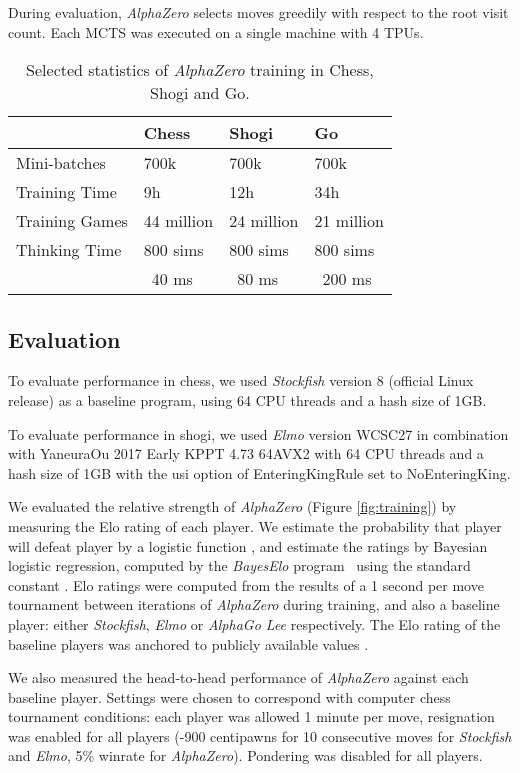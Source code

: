 \documentclass[12pt]{article}
\begin{document}
During evaluation, \emph{AlphaZero} selects moves greedily with respect to the root visit count. Each MCTS was executed on a single machine with 4 TPUs.

\begin{table}
\begin{tabularx}{\textwidth}{XXXX}
\toprule
& Chess & Shogi & Go \\
\midrule
Mini-batches & 700k & 700k & 700k \\
Training Time & 9h & 12h & 34h \\
Training Games & 44 million & 24 million & 21 million \\
Thinking Time & 800 sims & 800 sims & 800 sims  \\
              & ~40 ms & ~80 ms & ~200 ms \\
\bottomrule
\end{tabularx}
\caption
{
\label{tab:settings}
Selected statistics of \emph{AlphaZero} training in Chess, Shogi and Go. 
}
\end{table}

\subsection*{Evaluation}

To evaluate performance in chess, we used \emph{Stockfish} version 8 (official Linux release) as a baseline program, using 64 CPU threads and a hash size of 1GB.

To evaluate performance in shogi, we used \emph{Elmo} version WCSC27 in combination with YaneuraOu 2017 Early KPPT 4.73 64AVX2 with 64 CPU threads and a hash size of 1GB with the usi option of EnteringKingRule set to NoEnteringKing.

We evaluated the relative strength of \emph{AlphaZero} (Figure \ref{fig:training}) by measuring the Elo rating of each player. We estimate the probability that player  will defeat player  by a logistic function , and estimate the ratings  by Bayesian logistic regression, computed by the \emph{BayesElo} program~\cite{coulom:bayeselo} using the standard constant . 
Elo ratings were computed from the results of a 1 second per move tournament between iterations of \emph{AlphaZero} during training, and also a baseline player: either \emph{Stockfish}, \emph{Elmo} or \emph{AlphaGo Lee} respectively. The Elo rating of the baseline players was anchored to publicly available values \cite{Silver17AG0}. 

We also measured the head-to-head performance of \emph{AlphaZero} against each baseline player. Settings were chosen to correspond with computer chess tournament conditions: each player was allowed 1 minute per move, resignation was enabled for all players (-900 centipawns for 10 consecutive moves for \emph{Stockfish} and \emph{Elmo}, 5\% winrate for \emph{AlphaZero}). Pondering was disabled for all players.
\end{document}
